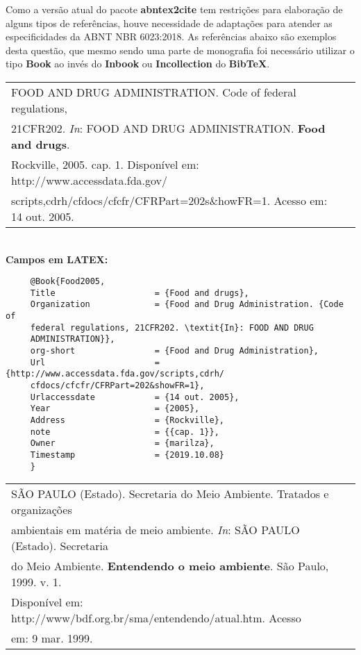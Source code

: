 	 Como a versão atual do pacote \textbf{abntex2cite} tem restrições para elaboração de alguns tipos de refer\^encias, houve necessidade de adaptações para atender as especificidades da ABNT NBR 6023:2018. As  refer\^encias abaixo são exemplos desta questão, que mesmo sendo uma parte de monografia foi necess\'ario utilizar o tipo  \textbf{Book} ao inv\'es do \textbf{Inbook} ou \textbf{Incollection} do \textbf{BibTeX}. \\
	 
	 \begin{tabular}{|l|c|} \hline
	 	FOOD AND DRUG ADMINISTRATION. Code of federal regulations, \\ 21CFR202. \textit{In}: FOOD AND DRUG ADMINISTRATION. \textbf{Food and drugs}. \\Rockville, 2005. cap. 1. Disponível em: http://www.accessdata.fda.gov/\\ scripts,cdrh/cfdocs/cfcfr/CFRPart=202s\&howFR=1. Acesso em: 14 out. 2005. \\\hline
	 \end{tabular} \\ 
	 
	 \textbf{Campos em LATEX:} 
	 
	 \begin{verbatim}
	 @Book{Food2005,
	 Title                    = {Food and drugs},
	 Organization             = {Food and Drug Administration. {Code of 
	 federal regulations, 21CFR202. \textit{In}: FOOD AND DRUG 
	 ADMINISTRATION}},
	 org-short                = {Food and Drug Administration},
	 Url                      = {http://www.accessdata.fda.gov/scripts,cdrh/
	 cfdocs/cfcfr/CFRPart=202&showFR=1},
	 Urlaccessdate            = {14 out. 2005},
	 Year                     = {2005},
	 Address                  = {Rockville},
	 note                     = {{cap. 1}},
	 Owner                    = {marilza},
	 Timestamp                = {2019.10.08}
	 }
	 \end{verbatim}
	 
		 
	 \begin{tabular}{|l|c|} \hline
	 	SÃO PAULO (Estado). Secretaria do Meio Ambiente. Tratados e organizações\\ ambientais em mat\'eria de meio ambiente. \textit{In}: SÃO PAULO (Estado). Secretaria \\ do Meio Ambiente. \textbf{Entendendo o meio ambiente}. São Paulo, 1999. v. 1. \\ Disponível em: http://www/bdf.org.br/sma/entendendo/atual.htm. Acesso \\ em: 9 mar. 1999.  \\\hline
	 \end{tabular} \\ 
	 
